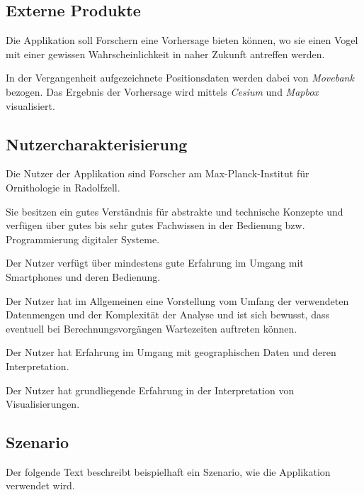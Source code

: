 \documentclass[12pt]{article} %
\begin{document}
\subsection{Externe Produkte}
Die Applikation soll Forschern eine Vorhersage bieten können, wo sie einen Vogel mit einer gewissen Wahrscheinlichkeit in naher Zukunft antreffen werden. 

In der Vergangenheit aufgezeichnete Positionsdaten werden dabei von \textit{Movebank} bezogen. Das Ergebnis der Vorhersage wird mittels \textit{Cesium} und \textit{Mapbox} visualisiert.


\subsection{Nutzercharakterisierung}

Die Nutzer der Applikation sind Forscher am Max-Planck-Institut für Ornithologie in Radolfzell.

Sie besitzen ein gutes Verständnis für abstrakte und technische Konzepte und verfügen über gutes bis sehr gutes Fachwissen in der Bedienung bzw. Programmierung digitaler Systeme.

Der Nutzer verfügt über mindestens gute Erfahrung im Umgang mit Smartphones und deren Bedienung.

Der Nutzer hat im Allgemeinen eine Vorstellung vom Umfang der verwendeten Datenmengen und der Komplexität der Analyse und ist sich bewusst, dass eventuell bei Berechnungsvorgängen Wartezeiten auftreten können.

Der Nutzer hat Erfahrung im Umgang mit geographischen Daten und deren Interpretation.

Der Nutzer hat grundliegende Erfahrung in der Interpretation von Visualisierungen.


\subsection{Szenario}

Der folgende Text beschreibt beispielhaft ein Szenario, wie die Applikation verwendet wird.
\end{document}
